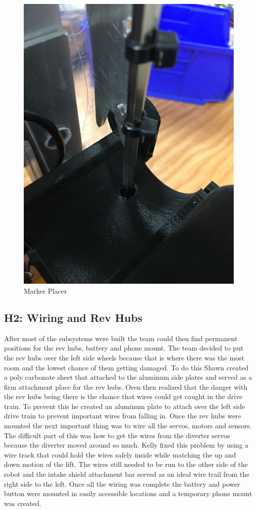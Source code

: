 \documentclass{article}
\begin{document}
\begin{figure}
    \centering
    \includegraphics[width=.6 \textwidth]{20_01-14/images/markerplacer.JPG}
    \caption{Marker Placer}
    \label{fig:markerplacer}
\end{figure}

\subsection{H2: Wiring and Rev Hubs}

After most of the subsystems were built the team could then find permanent positions for the rev hubs, battery and phone mount. The team decided to put the rev hubs over the left side wheels because that is where there was the most room and the lowest chance of them getting damaged. To do this Shawn created a poly carbonate sheet that attached to the aluminum side plates and served as a firm attachment place for the rev hubs. Oren then realized that the danger with the rev hubs being there is the chance that wires could get caught in the drive train. To prevent this he created an aluminum plate to attach over the left side drive train to prevent important wires from falling in. Once the rev hubs were mounted the next important thing was to wire all the servos, motors and sensors. The difficult part of this was how to get the wires from the diverter servos because the diverter moved around so much. Kelly fixed this problem by using a wire track that could hold the wires safely inside while matching the up and down motion of the lift. The wires still needed to be run to the other side of the robot and the intake shield attachment bar served as an ideal wire trail from the right side to the left. Once all the wiring was complete the battery and power button were mounted in easily accessible locations and a temporary phone mount was created.
\end{document}
